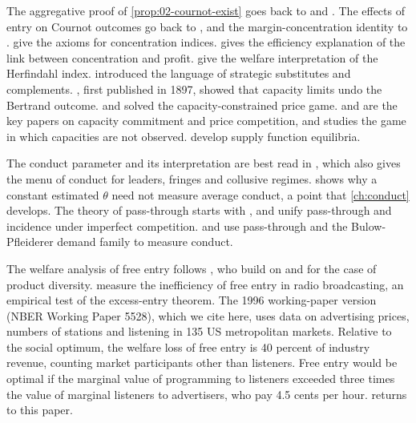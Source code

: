 The aggregative proof of \cref{prop:02-cournot-exist} goes back to \citet{SzidarovszkyYakowitz1977} and
\citet{Novshek1985}. The effects of entry on Cournot outcomes go back to \citet{Seade1980}, and the
margin-concentration identity to \citet{CowlingWaterson1976}. \citet{EncaouaJacquemin1980} give the axioms for
concentration indices. \citet{Demsetz1973} gives the efficiency explanation of the link between concentration and
profit. \citet{DansbyWillig1979} give the welfare interpretation of the Herfindahl index.
\citet{BulowGeanakoplosKlemperer1985} introduced the language of strategic substitutes and complements.
\citet{Edgeworth1925}, first published in 1897, showed that capacity limits undo the Bertrand outcome.
\citet{Beckmann1967} and \citet{LevitanShubik1972} solved the capacity-constrained price game.
\citet{KrepsScheinkman1983} and \citet{DavidsonDeneckere1986} are the key papers on capacity commitment and price
competition, and \citet{Gertner1985} studies the game in which capacities are not observed.
\citet{KlempererMeyer1989} develop supply function equilibria.

The conduct parameter and its interpretation are best read in \citet{Bresnahan1989}, which also gives the menu of
conduct for leaders, fringes and collusive regimes. \citet{Corts1999} shows why a constant estimated $\theta$ need
not measure average conduct, a point that \cref{ch:conduct} develops. The theory of pass-through starts with
\citet{BulowPfleiderer1983}, and \citet{WeylFabinger2013} unify pass-through and incidence under imperfect
competition. \citet{Sumner1981} and \citet{GenesoveMullin1998} use pass-through and the Bulow-Pfleiderer demand
family to measure conduct.

The welfare analysis of free entry follows \citet{MankiwWhinston1986}, who build on \citet{Spence1976} and
\citet{DixitStiglitz1977} for the case of product diversity. \citet{BerryWaldfogel1999} measure the inefficiency of
free entry in radio broadcasting, an empirical test of the excess-entry theorem. The 1996 working-paper version
(NBER Working Paper 5528), which we cite here, uses data on advertising prices, numbers of stations and listening in 135
US metropolitan markets. Relative to the social optimum, the welfare loss of free entry is 40 percent of industry
revenue, counting market participants other than listeners. Free entry would be optimal if the marginal value of
programming to listeners exceeded three times the value of marginal listeners to advertisers, who pay 4.5 cents per
hour.  returns to this paper.

